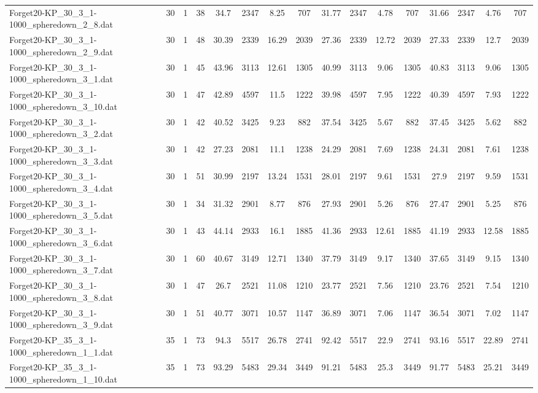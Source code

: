 \begin{sidewaystable}[!ht]
{\begin{tabular}{lccccccccccccccc}
Forget20-KP\_30\_3\_1-1000\_spheredown\_2\_8.dat & 30 & 1 & 38 & 34.7 & 2347 & 8.25 & 707 & 31.77 & 2347 & 4.78 & 707 & 31.66 & 2347 & 4.76 & 707 \\
Forget20-KP\_30\_3\_1-1000\_spheredown\_2\_9.dat & 30 & 1 & 48 & 30.39 & 2339 & 16.29 & 2039 & 27.36 & 2339 & 12.72 & 2039 & 27.33 & 2339 & 12.7 & 2039 \\
Forget20-KP\_30\_3\_1-1000\_spheredown\_3\_1.dat & 30 & 1 & 45 & 43.96 & 3113 & 12.61 & 1305 & 40.99 & 3113 & 9.06 & 1305 & 40.83 & 3113 & 9.06 & 1305 \\
Forget20-KP\_30\_3\_1-1000\_spheredown\_3\_10.dat & 30 & 1 & 47 & 42.89 & 4597 & 11.5 & 1222 & 39.98 & 4597 & 7.95 & 1222 & 40.39 & 4597 & 7.93 & 1222 \\
Forget20-KP\_30\_3\_1-1000\_spheredown\_3\_2.dat & 30 & 1 & 42 & 40.52 & 3425 & 9.23 & 882 & 37.54 & 3425 & 5.67 & 882 & 37.45 & 3425 & 5.62 & 882 \\
Forget20-KP\_30\_3\_1-1000\_spheredown\_3\_3.dat & 30 & 1 & 42 & 27.23 & 2081 & 11.1 & 1238 & 24.29 & 2081 & 7.69 & 1238 & 24.31 & 2081 &  \textcolor{blue2}{7.61} & 1238 \\
Forget20-KP\_30\_3\_1-1000\_spheredown\_3\_4.dat & 30 & 1 & 51 & 30.99 & 2197 & 13.24 & 1531 & 28.01 & 2197 & 9.61 & 1531 & 27.9 & 2197 & 9.59 & 1531 \\
Forget20-KP\_30\_3\_1-1000\_spheredown\_3\_5.dat & 30 & 1 & 34 & 31.32 & 2901 & 8.77 & 876 & 27.93 & 2901 & 5.26 & 876 & 27.47 & 2901 & 5.25 & 876 \\
Forget20-KP\_30\_3\_1-1000\_spheredown\_3\_6.dat & 30 & 1 & 43 & 44.14 & 2933 & 16.1 & 1885 & 41.36 & 2933 & 12.61 & 1885 & 41.19 & 2933 & 12.58 & 1885 \\
Forget20-KP\_30\_3\_1-1000\_spheredown\_3\_7.dat & 30 & 1 & 60 & 40.67 & 3149 & 12.71 & 1340 & 37.79 & 3149 & 9.17 & 1340 & 37.65 & 3149 & 9.15 & 1340 \\
Forget20-KP\_30\_3\_1-1000\_spheredown\_3\_8.dat & 30 & 1 & 47 & 26.7 & 2521 & 11.08 & 1210 & 23.77 & 2521 & 7.56 & 1210 & 23.76 & 2521 &  \textcolor{blue2}{7.54} & 1210 \\
Forget20-KP\_30\_3\_1-1000\_spheredown\_3\_9.dat & 30 & 1 & 51 & 40.77 & 3071 & 10.57 & 1147 & 36.89 & 3071 & 7.06 & 1147 & 36.54 & 3071 & 7.02 & 1147 \\
Forget20-KP\_35\_3\_1-1000\_spheredown\_1\_1.dat & 35 & 1 & 73 & 94.3 & 5517 & 26.78 & 2741 & 92.42 & 5517 & 22.9 & 2741 & 93.16 & 5517 & 22.89 & 2741 \\
Forget20-KP\_35\_3\_1-1000\_spheredown\_1\_10.dat & 35 & 1 & 73 & 93.29 & 5483 & 29.34 & 3449 & 91.21 & 5483 & 25.3 & 3449 & 91.77 & 5483 &  \textcolor{blue2}{25.21} & 3449 \\

\end{tabular}}
\end{sidewaystable}

